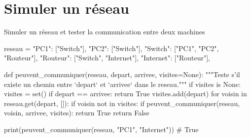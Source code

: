 

\section{Simuler un réseau}


\begin{codereference}{Simuler un réseau et tester la communication entre deux machines}
\begin{python}
reseau = {
    "PC1": ["Switch"],
    "PC2": ["Switch"],
    "Switch": ["PC1", "PC2", "Routeur"],
    "Routeur": ["Switch", "Internet"],
    "Internet": ["Routeur"],
}

def peuvent_communiquer(reseau, depart, arrivee, visites=None):
    """Teste s'il existe un chemin entre `depart` et `arrivee` dans le reseau."""
    if visites is None:
        visites = set()
    if depart == arrivee:
        return True
    visites.add(depart)
    for voisin in reseau.get(depart, []):
        if voisin not in visites:
            if peuvent_communiquer(reseau, voisin, arrivee, visites):
                return True
    return False

print(peuvent_communiquer(reseau, "PC1", "Internet"))  # True
\end{python}
\end{codereference}

